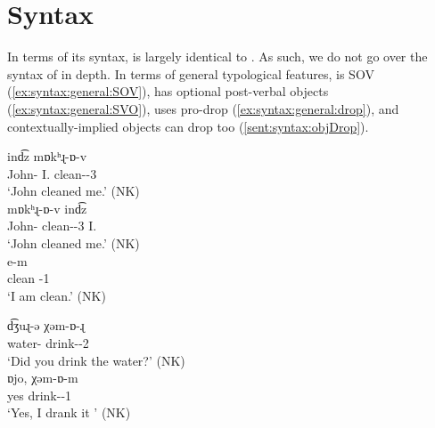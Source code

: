  

\chapter{Syntax}\label{chapter:syntax}

In terms of its syntax, {{\iaIA}}  is largely identical to {{\seaSEA}}. As such, we do not go over the syntax of {{\iaIA}} in depth. In terms of general typological features, {{\iaIA}}  is SOV (\ref{ex:syntax:general:SOV}), has optional post-verbal objects (\ref{ex:syntax:general:SVO}),  uses pro-drop (\ref{ex:syntax:general:drop}), and contextually-implied objects can drop too (\ref{sent:syntax:objDrop}). 

\begin{exe}
	\ex 
	\begin{xlist}
		\ex {} {ind͡z} {mɒkʰɻ-ɒ-v}
		\\
		John-{} I.{\dat} clean-{\pst}-3{\sg}
		\\
		\trans	`John cleaned me.' \label{ex:syntax:general:SOV} \hfill (NK)
		\\
		\ex {}  {mɒkʰɻ-ɒ-v} {ind͡z}
		\\
		John-{}  clean-{\pst}-3{\sg} I.{\dat}
		\\
		\trans		`John cleaned me.'  \label{ex:syntax:general:SVO}\hfill (NK)
		\\
		\ex {}  e-m
		\\
		clean {\auxgloss}-1{\sg}
		\\
		\trans	`I am clean.'  \label{ex:syntax:general:drop}\hfill (NK)
		\\
		\ex \label{sent:syntax:objDrop} %
		\begin{xlist}
			\ex\gll d͡ʒuɻ-ə χəm-ɒ-ɻ \\
			water-{} drink-{\pst}-2{\sg} \\
			\trans `Did you drink the water?' \hfill (NK) \\
						\ex\gll ɒjo,   χəm-ɒ-m \\
			yes drink-{\pst}-1{\sg} \\
			\trans `Yes, I drank it ' \hfill (NK) \\
		\end{xlist}
	\end{xlist}
\end{exe}

